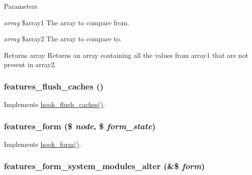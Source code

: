 \begin{DoxyParams}{Parameters}
\item[{\em array}]\$array1 The array to compare from. \item[{\em array}]\$array2 The array to compare to.\end{DoxyParams}
\begin{DoxyReturn}{Returns}
array Returns an array containing all the values from array1 that are not present in array2. 
\end{DoxyReturn}
\hypertarget{features_8module_a11ac8740ad0c9745b94a37e7da421d2b}{
\subsubsection[{features\_\-flush\_\-caches}]{\setlength{\rightskip}{0pt plus 5cm}features\_\-flush\_\-caches ()}}
\label{features_8module_a11ac8740ad0c9745b94a37e7da421d2b}
Implements \hyperlink{group__hooks_ga66531e6e564157b7ca45ed07549c9b97}{hook\_\-flush\_\-caches()}. \hypertarget{features_8module_a6a4b2e2f866538b3c0c7d950aea3f80f}{
\subsubsection[{features\_\-form}]{\setlength{\rightskip}{0pt plus 5cm}features\_\-form (\$ {\em node}, \/  \$ {\em form\_\-state})}}
\label{features_8module_a6a4b2e2f866538b3c0c7d950aea3f80f}
Implements \hyperlink{group__node__api__hooks_ga52618ef4643a60878dd5a76ff9bbff30}{hook\_\-form()}. \hypertarget{features_8module_a8035300a21d0bf61d8cbf8caa4f3c19b}{
\subsubsection[{features\_\-form\_\-system\_\-modules\_\-alter}]{\setlength{\rightskip}{0pt plus 5cm}features\_\-form\_\-system\_\-modules\_\-alter (\&\$ {\em form})}}
\label{features_8module_a8035300a21d0bf61d8cbf8caa4f3c19b}
